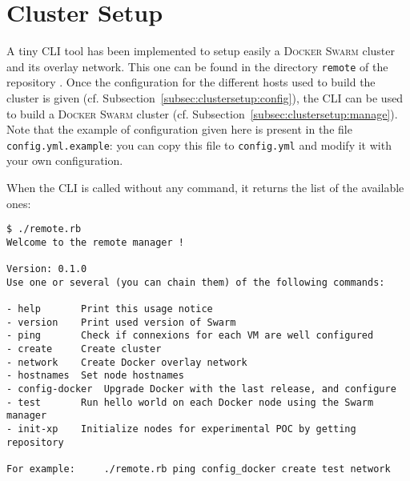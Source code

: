 
\section{Cluster Setup}
\label{sec:clustersetup}

A tiny CLI tool has been implemented to setup easily a \textsc{Docker Swarm} cluster and its overlay network.
This one can be found in the directory \texttt{remote} of the repository \securestreamrepo{}.
Once the configuration for the different hosts used to build the cluster is given (cf. Subsection~\ref{subsec:clustersetup:config}), the CLI can be used to build a \textsc{Docker Swarm} cluster (cf. Subsection~\ref{subsec:clustersetup:manage}).
Note that the example of configuration given here is present in the file \texttt{config.yml.example}: you can copy this file to \texttt{config.yml} and modify it with your own configuration.

When the CLI is called without any command, it returns the list of the available ones:

\begin{lstlisting}[basicstyle=\small]
$ ./remote.rb
Welcome to the remote manager !

Version: 0.1.0
Use one or several (you can chain them) of the following commands:

- help		 Print this usage notice
- version	 Print used version of Swarm
- ping		 Check if connexions for each VM are well configured
- create	 Create cluster
- network	 Create Docker overlay network
- hostnames	 Set node hostnames
- config-docker	 Upgrade Docker with the last release, and configure
- test		 Run hello world on each Docker node using the Swarm manager
- init-xp	 Initialize nodes for experimental POC by getting repository

For example:	 ./remote.rb ping config_docker create test network
\end{lstlisting}




\newpage





